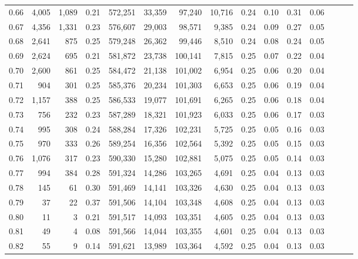 \begin{tabular}{rrrrrrrrrrrrrrr}
0.66 &   4,005 &  1,089 &  0.21 &  572,251 &   33,359 &   97,240 &   10,716 &  0.24 &  0.10 &  0.31 &      0.06 \\
0.67 &   4,356 &  1,331 &  0.23 &  576,607 &   29,003 &   98,571 &    9,385 &  0.24 &  0.09 &  0.27 &      0.05 \\
0.68 &   2,641 &    875 &  0.25 &  579,248 &   26,362 &   99,446 &    8,510 &  0.24 &  0.08 &  0.24 &      0.05 \\
0.69 &   2,624 &    695 &  0.21 &  581,872 &   23,738 &  100,141 &    7,815 &  0.25 &  0.07 &  0.22 &      0.04 \\
0.70 &   2,600 &    861 &  0.25 &  584,472 &   21,138 &  101,002 &    6,954 &  0.25 &  0.06 &  0.20 &      0.04 \\
0.71 &     904 &    301 &  0.25 &  585,376 &   20,234 &  101,303 &    6,653 &  0.25 &  0.06 &  0.19 &      0.04 \\
0.72 &   1,157 &    388 &  0.25 &  586,533 &   19,077 &  101,691 &    6,265 &  0.25 &  0.06 &  0.18 &      0.04 \\
0.73 &     756 &    232 &  0.23 &  587,289 &   18,321 &  101,923 &    6,033 &  0.25 &  0.06 &  0.17 &      0.03 \\
0.74 &     995 &    308 &  0.24 &  588,284 &   17,326 &  102,231 &    5,725 &  0.25 &  0.05 &  0.16 &      0.03 \\
0.75 &     970 &    333 &  0.26 &  589,254 &   16,356 &  102,564 &    5,392 &  0.25 &  0.05 &  0.15 &      0.03 \\
0.76 &   1,076 &    317 &  0.23 &  590,330 &   15,280 &  102,881 &    5,075 &  0.25 &  0.05 &  0.14 &      0.03 \\
0.77 &     994 &    384 &  0.28 &  591,324 &   14,286 &  103,265 &    4,691 &  0.25 &  0.04 &  0.13 &      0.03 \\
0.78 &     145 &     61 &  0.30 &  591,469 &   14,141 &  103,326 &    4,630 &  0.25 &  0.04 &  0.13 &      0.03 \\
0.79 &      37 &     22 &  0.37 &  591,506 &   14,104 &  103,348 &    4,608 &  0.25 &  0.04 &  0.13 &      0.03 \\
0.80 &      11 &      3 &  0.21 &  591,517 &   14,093 &  103,351 &    4,605 &  0.25 &  0.04 &  0.13 &      0.03 \\
0.81 &      49 &      4 &  0.08 &  591,566 &   14,044 &  103,355 &    4,601 &  0.25 &  0.04 &  0.13 &      0.03 \\
0.82 &      55 &      9 &  0.14 &  591,621 &   13,989 &  103,364 &    4,592 &  0.25 &  0.04 &  0.13 &      0.03 \\

\end{tabular}
